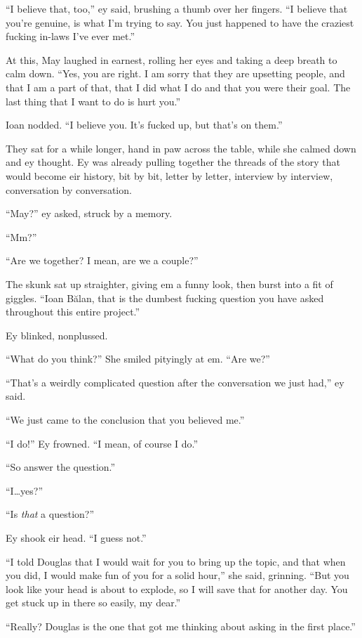 ``I believe that, too,'' ey said, brushing a thumb over her fingers. ``I believe that you're genuine, is what I'm trying to say. You just happened to have the craziest fucking in-laws I've ever met.''

At this, May laughed in earnest, rolling her eyes and taking a deep breath to calm down. ``Yes, you are right. I am sorry that they are upsetting people, and that I am a part of that, that I did what I do and that you were their goal. The last thing that I want to do is hurt you.''

Ioan nodded. ``I believe you. It's fucked up, but that's on them.''

They sat for a while longer, hand in paw across the table, while she calmed down and ey thought. Ey was already pulling together the threads of the story that would become eir history, bit by bit, letter by letter, interview by interview, conversation by conversation.

``May?'' ey asked, struck by a memory.

``Mm?''

``Are we together? I mean, are we a couple?''

The skunk sat up straighter, giving em a funny look, then burst into a fit of giggles. ``Ioan Bălan, that is the dumbest fucking question you have asked throughout this entire project.''

Ey blinked, nonplussed.

``What do you think?'' She smiled pityingly at em. ``Are we?''

``That's a weirdly complicated question after the conversation we just had,'' ey said.

``We just came to the conclusion that you believed me.''

``I do!'' Ey frowned. ``I mean, of course I do.''

``So answer the question.''

``I\ldots yes?''

``Is \emph{that} a question?''

Ey shook eir head. ``I guess not.''

``I told Douglas that I would wait for you to bring up the topic, and that when you did, I would make fun of you for a solid hour,'' she said, grinning. ``But you look like your head is about to explode, so I will save that for another day. You get stuck up in there so easily, my dear.''

``Really? Douglas is the one that got me thinking about asking in the first place.''

